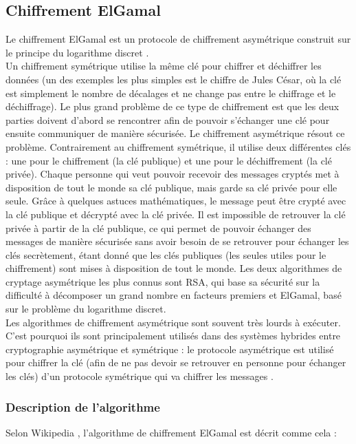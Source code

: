 \documentclass[10pt,a4paper,twoside]{article}
\numberwithin{equation}{section}
\begin{document}
	\subsection{Chiffrement ElGamal} \label{elgamal}
		Le chiffrement ElGamal est un protocole de chiffrement asymétrique construit sur le principe du logarithme discret \cite{wiki:chiffrement_elgamal}. \\
		Un chiffrement symétrique utilise la même clé pour chiffrer et déchiffrer les données (un des exemples les plus simples est le chiffre de Jules César, où la clé est simplement le nombre de décalages et ne change pas entre le chiffrage et le déchiffrage). Le plus grand problème de ce type de chiffrement est que les deux parties doivent d'abord se rencontrer afin de pouvoir s'échanger une clé pour ensuite communiquer de manière sécurisée. Le chiffrement asymétrique résout ce problème. Contrairement au chiffrement symétrique, il utilise deux différentes clés : une pour le chiffrement (la clé publique) et une pour le déchiffrement (la clé privée). Chaque personne qui veut pouvoir recevoir des messages cryptés met à disposition de tout le monde sa clé publique, mais garde sa clé privée pour elle seule. Grâce à quelques astuces mathématiques, le message peut être crypté avec la clé publique et décrypté avec la clé privée. Il est impossible de retrouver la clé privée à partir de la clé publique, ce qui permet de pouvoir échanger des messages de manière sécurisée sans avoir besoin de se retrouver pour échanger les clés secrètement, étant donné que les clés publiques (les seules utiles pour le chiffrement) sont mises à disposition de tout le monde. Les deux algorithmes de cryptage asymétrique les plus connus sont RSA, qui base sa sécurité sur la difficulté à décomposer un grand nombre en facteurs premiers et ElGamal, basé sur le problème du logarithme discret.\\
		Les algorithmes de chiffrement asymétrique sont souvent très lourds à exécuter. C'est pourquoi ils sont principalement utilisés dans des systèmes hybrides entre cryptographie asymétrique et symétrique : le protocole asymétrique est utilisé pour chiffrer la clé (afin de ne pas devoir se retrouver en personne pour échanger les clés) d'un protocole symétrique qui va chiffrer les messages \cite{wiki:cryptographie_hybride}.
		
		\subsubsection{Description de l'algorithme}
			Selon Wikipedia \cite{wiki:chiffrement_elgamal}, l'algorithme de chiffrement ElGamal est décrit comme cela : \\
			
\end{document}
